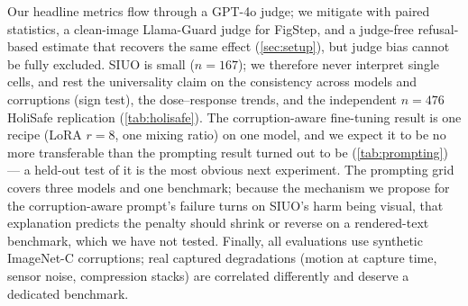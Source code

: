 Our headline metrics flow through a GPT-4o judge; we mitigate with paired statistics, a clean-image Llama-Guard judge for FigStep, and a judge-free refusal-based estimate that recovers the same effect (\cref{sec:setup}), but judge bias cannot be fully excluded. SIUO is small ($n{=}167$); we therefore never interpret single cells, and rest the universality claim on the consistency across models and corruptions (sign test), the dose--response trends, and the independent $n{=}476$ HoliSafe replication (\cref{tab:holisafe}). The corruption-aware fine-tuning result is one recipe (LoRA $r{=}8$, one mixing ratio) on one model, and we expect it to be no more transferable than the prompting result turned out to be (\cref{tab:prompting}) --- a held-out test of it is the most obvious next experiment. The prompting grid covers three models and one benchmark; because the mechanism we propose for the corruption-aware prompt's failure turns on SIUO's harm being visual, that explanation predicts the penalty should shrink or reverse on a rendered-text benchmark, which we have not tested. Finally, all evaluations use synthetic ImageNet-C corruptions; real captured degradations (motion at capture time, sensor noise, compression stacks) are correlated differently and deserve a dedicated benchmark.
